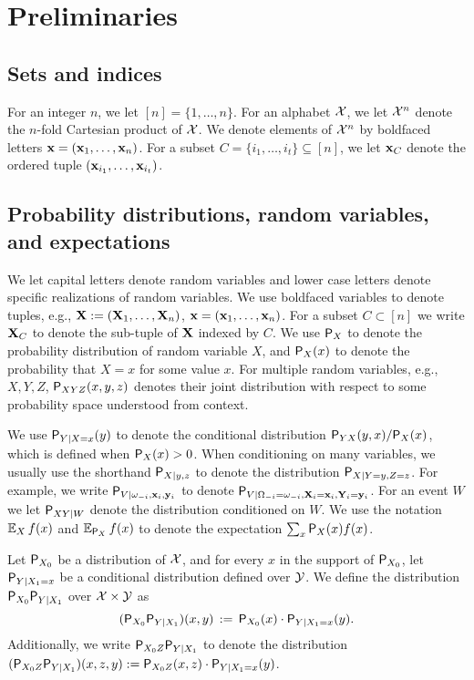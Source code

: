 \section{Preliminaries}
\label{sec:prelim}

\subsection{Sets and indices} 
For an integer $n$, we let $[n] = \{1,\ldots,n\}$. For an alphabet $\X$, we let $\X^n$ denote the $n$-fold Cartesian product of $\X$. We denote elements of $\X^n$ by boldfaced letters $\bx = (\bx_1,\ldots,\bx_n)$. For a subset $C = \{i_1,\ldots,i_t\} \subseteq [n]$, we let $\bx_C$ denote the ordered tuple $(\bx_{i_1},\ldots,\bx_{i_t})$.

\subsection{Probability distributions, random variables, and expectations}\label{subsec:prob_dist}
We let capital letters denote random variables and lower case letters denote specific realizations of random variables. We use boldfaced variables to denote tuples, e.g., $\bX := (\bX_1,\ldots,\bX_n)$, $\bx = (\bx_1,\ldots,\bx_n)$. For a subset $C \subset [n]$ we write $\bX_C$ to denote the sub-tuple of $\bX$ indexed by $C$. We use $\P_X$ to denote the probability distribution of random variable $X$, and $\P_X(x)$ to denote the probability that $X = x$ for some value $x$. For multiple random variables, e.g., $X, Y, Z$, $\P_{XYZ}(x,y,z)$  denotes their joint distribution with respect to some probability space understood from context. 

We use $\P_{Y | X = x}(y)$ to denote the conditional distribution $\P_{YX}(y,x)/\P_X(x)$, which is defined when $\P_X(x) > 0$. When conditioning on many variables, we usually use the shorthand $\P_{X | y,z}$ to denote the distribution $\P_{X | Y =y,Z=z}$. For example, we write $\P_{V | \omega_\mi, \bx_i, \by_i}$ to denote $\P_{V | \Omega_\mi = \omega_\mi, \bX_i = \bx_i, \bY_i = \by_i}$. For an event $W$ we let $\P_{X Y | W}$ denote the distribution conditioned on $W$. We use the notation $\Ex_{X} f(x)$ and $\Ex_{\P_X} f(x)$ to denote the expectation $\sum_{x} \P_X(x) f(x)$. 

Let $\P_{X_0}$ be a distribution of $\X$, and for every $x$ in the support of $\P_{X_0}$, let $\P_{Y | X_1 = x}$ be a conditional distribution defined over $\Y$. We define the distribution $\P_{X_0} \P_{Y | X_1}$ over $\X \times \Y$ as
$$
	(\P_{X_0} \P_{Y | X_1})(x,y) \,:=\, \P_{X_0}(x) \cdot \P_{Y | X_1 = x}(y).
$$
Additionally, we write $\P_{X_0 Z} \P_{Y | X_1}$ to denote the distribution $(\P_{X_0 Z} \P_{Y | X_1})(x,z,y) := \P_{X_0 Z}(x,z) \cdot \P_{Y | X_1 = x}(y)$.

